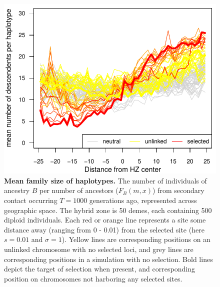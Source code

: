 \documentclass[11pt,letterpaper]{article}
\newcommand{\alisa}[1]{{\em \color{red} #1}}
\begin{document}


\begin{figure}
\includegraphics{figs/number_of_ancestors_tau1000.pdf}
\caption{\textbf{Mean family size of haplotypes.} The number of individuals of ancestry $B$ per number of ancestors ($F_B(m,x)$) from secondary contact occurring $T=1000$ generations ago, represented across geographic space. The hybrid zone is 50 demes, each containing 500 diploid individuals.
 Each red or orange line represents a site some distance away (ranging from 0 - 0.01) from the selected site (here $s=0.01$ and $\sigma=1$). Yellow lines are corresponding positions on an unlinked chromosome with no selected loci, and grey lines are corresponding positions in a simulation with no selection.  Bold lines depict the target of selection when present, and corresponding position on chromosomes not harboring any selected sites.}\label{Fig:family_size}
\end{figure}
\end{document}

